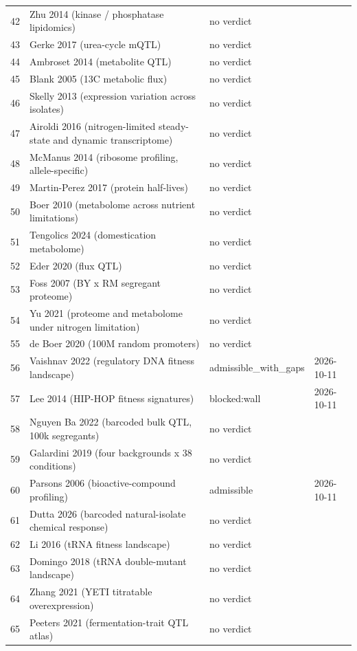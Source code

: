 \begin{longtable}{@{}r L{88mm} L{40mm} L{24mm}@{}}
42 & Zhu 2014 (kinase / phosphatase lipidomics) & no verdict &  \\
43 & Gerke 2017 (urea-cycle mQTL) & no verdict &  \\
44 & Ambroset 2014 (metabolite QTL) & no verdict &  \\
45 & Blank 2005 (13C metabolic flux) & no verdict &  \\
46 & Skelly 2013 (expression variation across isolates) & no verdict &  \\
47 & Airoldi 2016 (nitrogen-limited steady-state and dynamic transcriptome) & no verdict &  \\
48 & McManus 2014 (ribosome profiling, allele-specific) & no verdict &  \\
49 & Martin-Perez 2017 (protein half-lives) & no verdict &  \\
50 & Boer 2010 (metabolome across nutrient limitations) & no verdict &  \\
51 & Tengolics 2024 (domestication metabolome) & no verdict &  \\
52 & Eder 2020 (flux QTL) & no verdict &  \\
53 & Foss 2007 (BY x RM segregant proteome) & no verdict &  \\
54 & Yu 2021 (proteome and metabolome under nitrogen limitation) & no verdict &  \\
55 & de Boer 2020 (100M random promoters) & no verdict &  \\
56 & Vaishnav 2022 (regulatory DNA fitness landscape) & admissible\_with\_gaps & 2026-10-11 \\
57 & Lee 2014 (HIP-HOP fitness signatures) & blocked:wall & 2026-10-11 \\
58 & Nguyen Ba 2022 (barcoded bulk QTL, 100k segregants) & no verdict &  \\
59 & Galardini 2019 (four backgrounds x 38 conditions) & no verdict &  \\
60 & Parsons 2006 (bioactive-compound profiling) & admissible & 2026-10-11 \\
61 & Dutta 2026 (barcoded natural-isolate chemical response) & no verdict &  \\
62 & Li 2016 (tRNA fitness landscape) & no verdict &  \\
63 & Domingo 2018 (tRNA double-mutant landscape) & no verdict &  \\
64 & Zhang 2021 (YETI titratable overexpression) & no verdict &  \\
65 & Peeters 2021 (fermentation-trait QTL atlas) & no verdict &  \\

\end{longtable}
